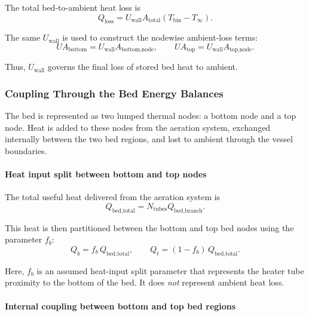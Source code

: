 \documentclass{article}
\begin{document}
The total bed-to-ambient heat loss is
\begin{equation}
Q_{\text{loss}}
=
U_{\text{wall}}A_{\text{total}}
\left(T_{\text{bin}}-T_{\infty}\right).
\end{equation}

The same $U_{\text{wall}}$ is used to construct the nodewise ambient-loss
terms:
\begin{equation}
UA_{\text{bottom}}=U_{\text{wall}}A_{\text{bottom,node}},
\qquad
UA_{\text{top}}=U_{\text{wall}}A_{\text{top,node}}.
\end{equation}

Thus, $U_{\text{wall}}$ governs the final loss of stored bed heat to ambient.

\subsubsection{Coupling Through the Bed Energy Balances}

The bed is represented as two lumped thermal nodes: a bottom node and a top
node. Heat is added to these nodes from the aeration system, exchanged
internally between the two bed regions, and lost to ambient through the
vessel boundaries.

\paragraph{Heat input split between bottom and top nodes}

The total useful heat delivered from the aeration system is
\begin{equation}
Q_{\text{bed,total}} = N_{\text{tubes}} Q_{\text{bed,branch}}.
\end{equation}

This heat is then partitioned between the bottom and top bed nodes using the
parameter $f_b$:
\begin{equation}
Q_b = f_b\,Q_{\text{bed,total}},
\qquad
Q_t = (1-f_b)\,Q_{\text{bed,total}}.
\end{equation}

Here, $f_b$ is an assumed heat-input split parameter that represents the
heater tube proximity to the bottom of the bed. It does \emph{not} represent
ambient heat loss.

\paragraph{Internal coupling between bottom and top bed regions}
\end{document}
